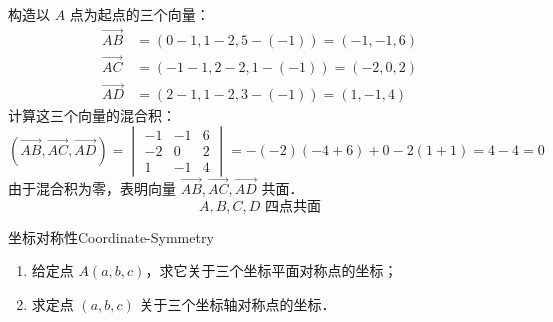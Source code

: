 \begin{solution}
    构造以 $A$ 点为起点的三个向量：
    \begin{equation}
        \begin{aligned}
            \overrightarrow{AB} & = (0-1, 1-2, 5-(-1)) = (-1, -1, 6) \\
            \overrightarrow{AC} & = (-1-1, 2-2, 1-(-1)) = (-2, 0, 2) \\
            \overrightarrow{AD} & = (2-1, 1-2, 3-(-1)) = (1, -1, 4)
        \end{aligned}
    \end{equation}
    计算这三个向量的混合积：
    \begin{equation}
        (\overrightarrow{AB}, \overrightarrow{AC}, \overrightarrow{AD}) = \begin{vmatrix} -1 & -1 & 6 \\ -2 & 0 & 2 \\ 1 & -1 & 4 \end{vmatrix} = -(-2)(-4 + 6) + 0 - 2(1 + 1) = 4 - 4 = 0
    \end{equation}
    由于混合积为零，表明向量 $\overrightarrow{AB}, \overrightarrow{AC}, \overrightarrow{AD}$ 共面．
    \begin{equation}
        \boxed{A, B, C, D \text{ 四点共面}}
    \end{equation}
\end{solution}

\begin{problem}{坐标对称性}{Coordinate-Symmetry}
    \begin{enumerate}
        \item 给定点 $A(a, b, c)$，求它关于三个坐标平面对称点的坐标；
        \item 求定点 $(a, b, c)$ 关于三个坐标轴对称点的坐标．
    \end{enumerate}
\end{problem}

